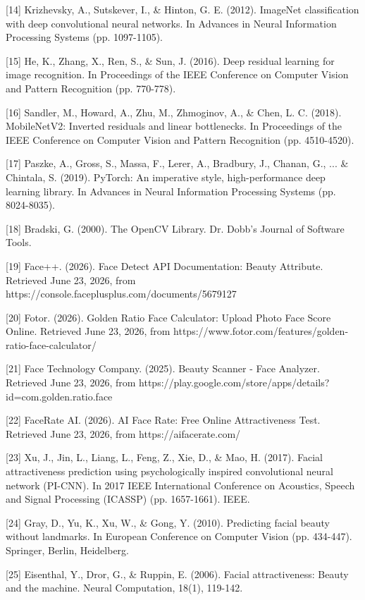 [14] Krizhevsky, A., Sutskever, I., & Hinton, G. E. (2012). ImageNet classification with deep convolutional neural networks. In Advances in Neural Information Processing Systems (pp. 1097-1105).

[15] He, K., Zhang, X., Ren, S., & Sun, J. (2016). Deep residual learning for image recognition. In Proceedings of the IEEE Conference on Computer Vision and Pattern Recognition (pp. 770-778).

[16] Sandler, M., Howard, A., Zhu, M., Zhmoginov, A., & Chen, L. C. (2018). MobileNetV2: Inverted residuals and linear bottlenecks. In Proceedings of the IEEE Conference on Computer Vision and Pattern Recognition (pp. 4510-4520).

[17] Paszke, A., Gross, S., Massa, F., Lerer, A., Bradbury, J., Chanan, G., ... & Chintala, S. (2019). PyTorch: An imperative style, high-performance deep learning library. In Advances in Neural Information Processing Systems (pp. 8024-8035).

[18] Bradski, G. (2000). The OpenCV Library. Dr. Dobb's Journal of Software Tools.

[19] Face++. (2026). Face Detect API Documentation: Beauty Attribute. Retrieved June 23, 2026, from https://console.faceplusplus.com/documents/5679127

[20] Fotor. (2026). Golden Ratio Face Calculator: Upload Photo Face Score Online. Retrieved June 23, 2026, from https://www.fotor.com/features/golden-ratio-face-calculator/

[21] Face Technology Company. (2025). Beauty Scanner - Face Analyzer. Retrieved June 23, 2026, from https://play.google.com/store/apps/details?id=com.golden.ratio.face

[22] FaceRate AI. (2026). AI Face Rate: Free Online Attractiveness Test. Retrieved June 23, 2026, from https://aifacerate.com/

[23] Xu, J., Jin, L., Liang, L., Feng, Z., Xie, D., & Mao, H. (2017). Facial attractiveness prediction using psychologically inspired convolutional neural network (PI-CNN). In 2017 IEEE International Conference on Acoustics, Speech and Signal Processing (ICASSP) (pp. 1657-1661). IEEE.

[24] Gray, D., Yu, K., Xu, W., & Gong, Y. (2010). Predicting facial beauty without landmarks. In European Conference on Computer Vision (pp. 434-447). Springer, Berlin, Heidelberg.

[25] Eisenthal, Y., Dror, G., & Ruppin, E. (2006). Facial attractiveness: Beauty and the machine. Neural Computation, 18(1), 119-142.

